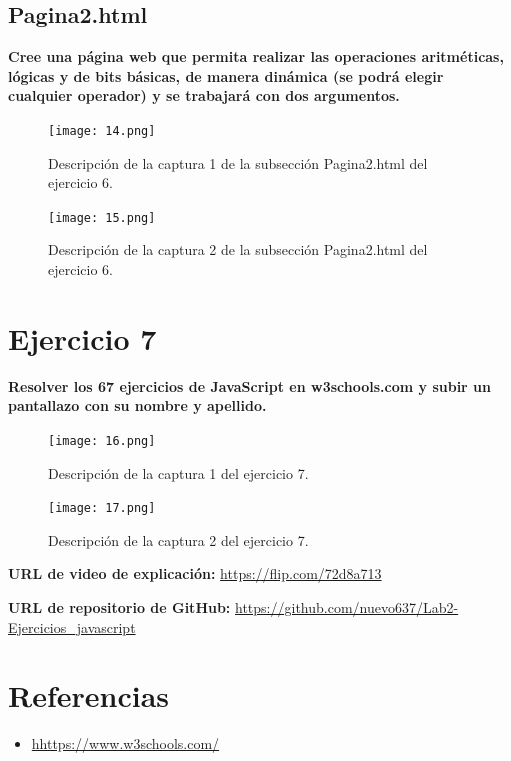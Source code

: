 \documentclass{article}
\begin{document}
\subsection{Pagina2.html}
\textbf{Cree una página web que permita realizar las operaciones aritméticas, lógicas y de bits básicas, de manera dinámica (se podrá elegir cualquier operador) y se trabajará con dos argumentos.}

\begin{figure}[htbp]
    \centering
    \texttt{[image: 14.png]}
    \caption{Descripción de la captura 1 de la subsección Pagina2.html del ejercicio 6.}
\end{figure}
\begin{figure}[htbp]
    \centering
    \texttt{[image: 15.png]}
    \caption{Descripción de la captura 2 de la subsección Pagina2.html del ejercicio 6.}
\end{figure}

\section{Ejercicio 7}
\textbf{Resolver los 67 ejercicios de JavaScript en w3schools.com y subir un pantallazo con su nombre y apellido.}

\begin{figure}[htbp]
    \centering
    \texttt{[image: 16.png]}
    \caption{Descripción de la captura 1 del ejercicio 7.}
\end{figure}
\begin{figure}[htbp]
    \centering
    \texttt{[image: 17.png]}
    \caption{Descripción de la captura 2 del ejercicio 7.}
\end{figure}
\item \textbf{URL de video de explicación:} \url{https://flip.com/72d8a713}
\item \textbf{URL de repositorio de GitHub:} \url{https://github.com/nuevo637/Lab2-Ejercicios_javascript}
        
\section{Referencias}
\begin{itemize}			
	\item \url{hhttps://www.w3schools.com/}
\end{itemize}	
	
%
%
%
			
\end{document}
